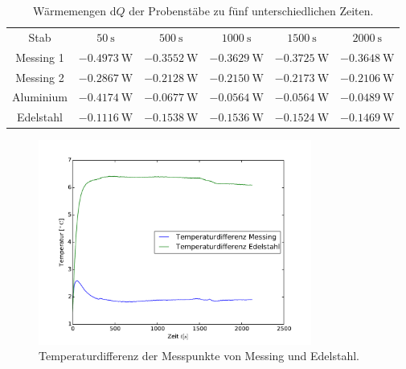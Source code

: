 %
\begin{table}
	\centering
	\begin{tabular}{cccccc}
	\sisetup{table-format=1.4}\\
\toprule
	Stab & $50\:\si\second$ & $500\:\si\second$ & $1000\:\si\second$ & $1500\:\si\second$ & $2000\:\si\second$ \\
	\midrule
	Messing 1 &$-0.4973\:\si{\watt}$ &$-0.3552\:\si{\watt}$&$-0.3629\:\si{\watt}$&$-0.3725\:\si{\watt}$&$-0.3648\:\si{\watt}$\\
	Messing 2 &$-0.2867\:\si{\watt}$& $-0.2128\:\si{\watt}$&$-0.2150\:\si{\watt}$&$-0.2173\:\si{\watt}$&$-0.2106\:\si{\watt}$\\
	Aluminium &$-0.4174\:\si{\watt}$&$-0.0677\:\si{\watt}$&$-0.0564\:\si{\watt}$&$-0.0564\:\si{\watt}$&$-0.0489\:\si{\watt}$\\
	Edelstahl &$-0.1116\:\si{\watt}$&$-0.1538\:\si{\watt}$&$-0.1536\:\si{\watt}$&$-0.1524\:\si{\watt}$&$-0.1469\:\si{\watt}$\\
	\bottomrule
	\end{tabular}
	\caption{Wärmemengen d$Q$ der Probenstäbe zu fünf unterschiedlichen Zeiten.}
\label{tab:waememengen}
\end{table}

\begin{figure}
	\centering
	\includegraphics[width=0.8\textwidth]{Bilder/M1_Tempdiff.pdf}
	\caption{Temperaturdifferenz der Messpunkte von Messing und Edelstahl.}
\label{fig:tempverl}
\end{figure}

